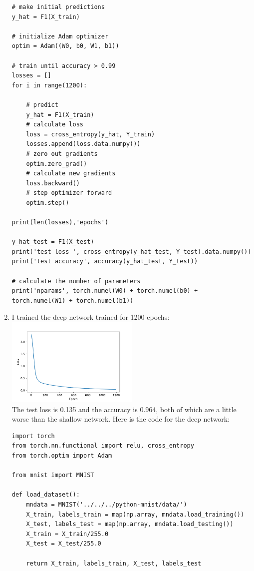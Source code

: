 \documentclass{article}
\begin{document}
\begin{enumerate}
\begin{verbatim}
# make initial predictions
y_hat = F1(X_train)

# initialize Adam optimizer
optim = Adam((W0, b0, W1, b1))

# train until accuracy > 0.99
losses = []
for i in range(1200):

    # predict
    y_hat = F1(X_train)
    # calculate loss
    loss = cross_entropy(y_hat, Y_train)
    losses.append(loss.data.numpy())
    # zero out gradients
    optim.zero_grad()
    # calculate new gradients
    loss.backward()
    # step optimizer forward 
    optim.step()

print(len(losses),'epochs')
    
y_hat_test = F1(X_test)
print('test loss ', cross_entropy(y_hat_test, Y_test).data.numpy())
print('test accuracy', accuracy(y_hat_test, Y_test))

# calculate the number of parameters
print('nparams', torch.numel(W0) + torch.numel(b0) + torch.numel(W1) + torch.numel(b1))
        \end{verbatim}

        \newpage
        \item I trained the deep network trained for 1200 epochs: \\
        \includegraphics[width=0.5\textwidth]{code/A6b.pdf} \\
        The test loss is 0.135 and the accuracy is 0.964, both of which are a little worse than the shallow network.
        Here is the code for the deep network:
        \begin{verbatim}
import torch
from torch.nn.functional import relu, cross_entropy
from torch.optim import Adam

from mnist import MNIST

def load_dataset():
    mndata = MNIST('../../../python-mnist/data/')
    X_train, labels_train = map(np.array, mndata.load_training())
    X_test, labels_test = map(np.array, mndata.load_testing())
    X_train = X_train/255.0
    X_test = X_test/255.0
    
    return X_train, labels_train, X_test, labels_test


\end{verbatim}
\end{enumerate}
\end{document}
